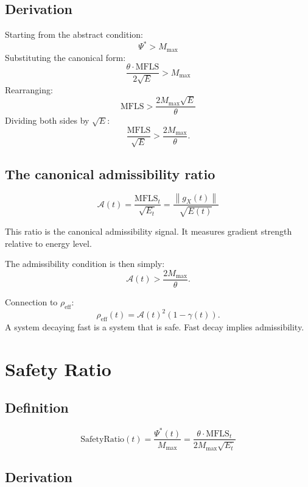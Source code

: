 \documentclass[11pt,a4paper]{article}
\theoremstyle{definition}
\newcommand{\norm}[1]{\left\|#1\right\|}
\newcommand{\gX}{g_X}
\newcommand{\mfls}{\mathrm{MFLS}}
\begin{document}
\subsection{Derivation}

Starting from the abstract condition:
\[
\Psi^* > M_\mathrm{max}
\]
Substituting the canonical form:
\[
\frac{\theta\cdot\mfls}{2\sqrt{E}} > M_\mathrm{max}
\]
Rearranging:
\[
\mfls > \frac{2M_\mathrm{max}\sqrt{E}}{\theta}
\]
Dividing both sides by $\sqrt{E}$:
\[
\frac{\mfls}{\sqrt{E}} > \frac{2M_\mathrm{max}}{\theta}.
\]

\subsection{The canonical admissibility ratio}

\begin{lockedbox}
\[
\mathcal{A}(t) = \frac{\mfls_t}{\sqrt{E_t}} = \frac{\norm{\gX(t)}}{\sqrt{E(t)}}
\]
\end{lockedbox}

This ratio is the canonical admissibility signal. It measures gradient strength relative to energy level.

The admissibility condition is then simply:
\[
\mathcal{A}(t) > \frac{2M_\mathrm{max}}{\theta}.
\]

Connection to $\rho_\mathrm{eff}$:
\[
\rho_\mathrm{eff}(t) = \mathcal{A}(t)^2(1-\gamma(t)).
\]
A system decaying fast is a system that is safe. Fast decay implies admissibility.

\section{Safety Ratio}

\subsection{Definition}

\begin{lockedbox}
\[
\mathrm{SafetyRatio}(t) = \frac{\Psi^*(t)}{M_\mathrm{max}} = \frac{\theta\cdot\mfls_t}{2M_\mathrm{max}\sqrt{E_t}}
\]
\end{lockedbox}

\subsection{Derivation}
\end{document}
